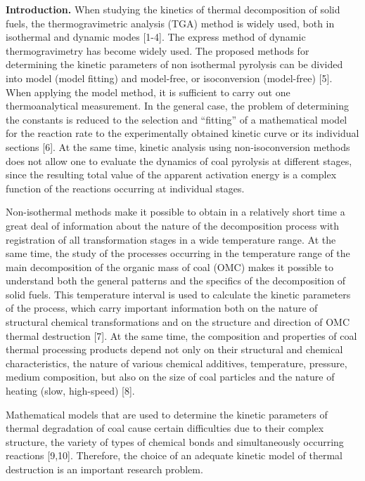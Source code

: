 \textbf{Introduction.} When studying the kinetics of thermal
decomposition of solid fuels, the thermogravimetric analysis (TGA)
method is widely used, both in isothermal and dynamic modes {[}1-4{]}.
The express method of dynamic thermogravimetry has become widely used.
The proposed methods for determining the kinetic parameters of non
isothermal pyrolysis can be divided into model (model fitting) and
model-free, or isoconversion (model-free) {[}5{]}. When applying the
model method, it is sufficient to carry out one thermoanalytical
measurement. In the general case, the problem of determining the
constants is reduced to the selection and ``fitting'' of a mathematical
model for the reaction rate to the experimentally obtained kinetic curve
or its individual sections {[}6{]}. At the same time, kinetic analysis
using non-isoconversion methods does not allow one to evaluate the
dynamics of coal pyrolysis at different stages, since the resulting
total value of the apparent activation energy is a complex function of
the reactions occurring at individual stages.

Non-isothermal methods make it possible to obtain in a relatively short
time a great deal of information about the nature of the decomposition
process with registration of all transformation stages in a wide
temperature range. At the same time, the study of the processes
occurring in the temperature range of the main decomposition of the
organic mass of coal (OMC) makes it possible to understand both the
general patterns and the specifics of the decomposition of solid fuels.
This temperature interval is used to calculate the kinetic parameters of
the process, which carry important information both on the nature of
structural chemical transformations and on the structure and direction
of OMC thermal destruction {[}7{]}. At the same time, the composition
and properties of coal thermal processing products depend not only on
their structural and chemical characteristics, the nature of various
chemical additives, temperature, pressure, medium composition, but also
on the size of coal particles and the nature of heating (slow,
high-speed) {[}8{]}.

Mathematical models that are used to determine the kinetic parameters of
thermal degradation of coal cause certain difficulties due to their
complex structure, the variety of types of chemical bonds and
simultaneously occurring reactions {[}9,10{]}. Therefore, the choice of
an adequate kinetic model of thermal destruction is an important
research problem.

